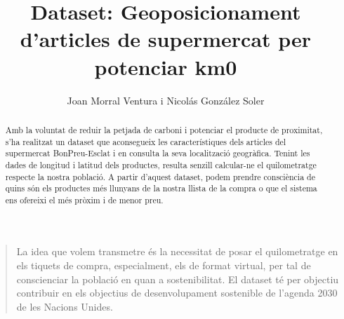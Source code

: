 \documentclass[]{scrartcl}
\title{Dataset: Geoposicionament d'articles de supermercat per potenciar km0}
\author{Joan Morral Ventura i Nicolás González Soler}
\begin{document}
\maketitle

\begin{abstract}
Amb la voluntat de reduir la petjada de carboni i potenciar el producte de proximitat, s'ha realitzat un dataset que aconsegueix les característiques dels articles del supermercat BonPreu-Esclat i en consulta la seva localització geogràfica. Tenint les dades de longitud i latitud dels productes, resulta senzill calcular-ne el quilometratge respecte la nostra població. A partir d'aquest dataset, podem prendre consciència de quins són els productes més llunyans de la nostra llista de la compra o que el sistema ens ofereixi el més pròxim i de menor preu. 
\end{abstract}

\begin{quote}
	La idea que volem transmetre és la necessitat de posar el quilometratge en els tiquets de compra, especialment, els de format virtual, per tal de conscienciar la població en quan a sostenibilitat. El dataset té per objectiu contribuir en els objectius de desenvolupament sostenible de l'agenda 2030 de les Nacions Unides.
\end{quote}
\end{document}
